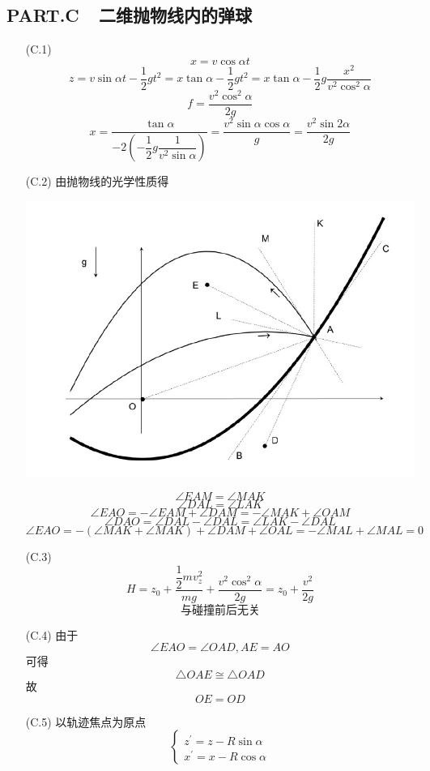 \documentclass{article}
\begin{document}
\subsection*{PART.C\ \ 二维抛物线内的弹球}
\begin{itemize}
    \item[(C.1)]
    \[x=v\cos\alpha t\]
    \[z=v\sin\alpha t-\dfrac 12gt^2=x\tan\alpha-\dfrac 12gt^2=x\tan\alpha-\dfrac 12g\dfrac{x^2}{v^2\cos^2\alpha}\]
    \[f=\frac{v^2\cos^2\alpha}{2g}\]
    \[x=\dfrac{\tan\alpha}{-2(-\dfrac12g\dfrac1{v^2\sin\alpha})}=\dfrac{v^2\sin\alpha\cos\alpha}{g}=\frac{v^2\sin2\alpha}{2g}\]
    \item[(C.2)]由抛物线的光学性质得
    \begin{center}
        \includegraphics[scale=0.3]{img/0017.4.jpg}\par
    \end{center}
    \[\angle EAM=\angle MAK\]
    \[\angle DAL=\angle LAK\]
    \[\angle EAO=-\angle EAM+\angle DAM=-\angle MAK+\angle OAM\]
    \[\angle DAO=\angle DAL-\angle DAL=\angle LAK-\angle DAL\]
    \[\angle EAO=-(\angle MAK+\angle MAK)+\angle DAM+\angle OAL=-\angle MAL+\angle MAL=0\]
    \item[(C.3)]
    \[H=z_{0}+\dfrac{\dfrac{1}{2}mv_z^{2}}{mg}+\frac{v^{2}\cos^{2}\alpha}{2g}=z_{0}+\frac{v^{2}}{2g}\]
    \[与碰撞前后无关\]
    \item[(C.4)]由于
    \[\angle EAO=\angle OAD,AE=AO\]
    可得
    \[\triangle OAE\cong\triangle OAD\]
    故
    \[OE=OD\]
    \item[(C.5)] 以轨迹焦点为原点
    \[\begin{cases}z^{\prime}=z-R\sin\alpha\\x^{\prime}=x-R\cos\alpha\end{cases}\]

\end{itemize}
\end{document}
